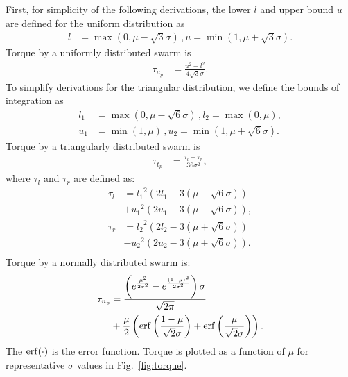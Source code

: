 First,  for simplicity of the following derivations, the lower $l$ and upper bound $u$ are defined for the uniform distribution as
\begin{align}
l &= \max(0,\mu -\sqrt{3} \sigma) \, , u = \min({1,\mu+\sqrt{3}\sigma}).
\end{align}
Torque by a uniformly distributed swarm is
\begin{align}
\tau_{u_p} &=  \frac{u^2-l^2}{4\sqrt{3}\sigma}. %
\end{align}
To simplify derivations for the triangular distribution, we define the bounds of integration as
\begin{align}
l_1 &= \max({0,\mu-\sqrt{6}\sigma})\, , l_2 = \max({0,\mu}),\\ \nonumber
u_1 &= \min({1,\mu})\, , u_2 = \min({1,\mu+\sqrt{6}\sigma}). \nonumber
\end{align}
Torque by a triangularly distributed swarm is
\begin{align}
\tau_{t_p} &= \frac{\tau_{l} + \tau_{r}}{36\sigma^2},
\end{align}
where $\tau_{l}$ and $\tau_{r}$ are defined as:
\begin{align}
\tau_{l} &= {l_1}^2(2l_1-3(\mu-\sqrt{6}\sigma)) \\ \nonumber
&+{u_1}^2(2u_1 - 3(\mu-\sqrt{6}\sigma)), \\ \nonumber%
\tau_{r} &= {l_2}^2(2{l_2}-3(\mu+\sqrt{6}\sigma))\\ \nonumber
&-{u_2}^2(2u_2 - 3(\mu+\sqrt{6}\sigma)).\\ \nonumber %
\end{align}
Torque by a normally distributed swarm is:
\begin{align} \label{eq:normalTorque}
\tau_{n_p} &= \frac{\left(e^{\frac{\mu^2}{2\sigma^2}}-e^{\frac{(1-\mu)^2}{2\sigma^2}}\right)\sigma}{\sqrt{2\pi}}\\ \nonumber
&+ \frac{\mu}{2}\left(\operatorname{erf}\left(\frac{1-\mu}{\sqrt{2}\sigma}\right)+\operatorname{erf}\left(\frac{\mu}{\sqrt{2}\sigma}\right)\right) .
\end{align}
The $\operatorname{erf}(\cdot)$ is the error function. Torque is plotted as a function of $\mu$ for representative $\sigma$ values in Fig.~\ref{fig:torque}.
